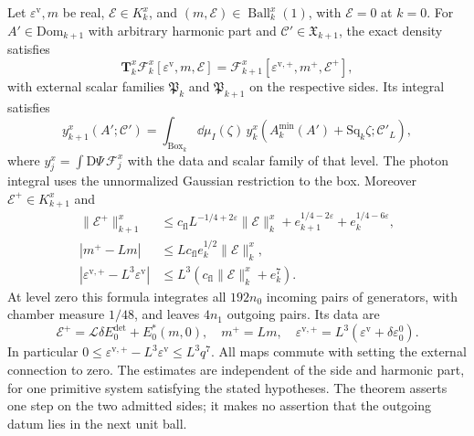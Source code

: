 \begin{theorem}
Let $\varepsilon^{\mathrm v},m$ be real,
$\mathscr E\in K_k^x$, and
$(m,\mathscr E)\in\operatorname{Ball}_k^x(1)$, with
$\mathscr E=0$ at $k=0$. For $A'\in\mathrm{Dom}_{k+1}$
with arbitrary harmonic part and
$\mathscr C'\in\mathfrak X_{k+1}$, the exact density satisfies
\begin{equation}\label{eq:rgnl-exact-step}
 \mathbf T_k^x\mathscr F_k^x[\varepsilon^{\mathrm v},m,\mathscr E]
   =\mathscr F_{k+1}^x
            [\varepsilon^{\mathrm v,+},m^+,\mathscr E^+],
\end{equation}
with external scalar families $\mathfrak P_k$ and
$\mathfrak P_{k+1}$ on the respective sides.
Its integral satisfies
\begin{equation}\label{eq:rgnl-integrated-step}
 y_{k+1}^x(A';\mathscr C')
  =\int_{\mathrm{Box}_k}\dd\mu_I(\zeta)\,
        y_k^x(A_k^{\min}(A')+\mathrm{Sq}_k\zeta;\mathscr C'_L),
\end{equation}
where $y_j^x=\int\mathrm D\Psi\,\mathscr F_j^x$ with the
data and scalar family of that level. The photon integral uses the
unnormalized Gaussian restriction to the box.
Moreover $\mathscr E^+\in K_{k+1}^x$ and
\begin{align}
 \|\mathscr E^+\|_{k+1}^x
 &\le c_{\mathrm{fl}}L^{-1/4+2\varepsilon}\|\mathscr E\|_k^x
           +e_{k+1}^{1/4-2\varepsilon}+e_k^{1/4-6\varepsilon},
                                      \label{eq:rgnl-activity-step-bound}\\
 |m^+-Lm|
 &\le Lc_{\mathrm{fl}}e_k^{1/2}\|\mathscr E\|_k^x,
                                      \label{eq:rgnl-mass-step-bound}\\
 |\varepsilon^{\mathrm v,+}-L^3\varepsilon^{\mathrm v}|
 &\le L^3(c_{\mathrm{fl}}\|\mathscr E\|_k^x+e_k^7).
                                      \label{eq:rgnl-vacuum-step-bound}
\end{align}
At level zero this formula integrates all $192n_0$
incoming pairs of generators, with chamber measure $1/48$,
and leaves $4n_1$ outgoing pairs. Its data are
\[
 \mathscr E^+=\mathcal L\delta E_0^{\mathrm{det}}+E_0^*(m,0),
 \quad m^+=Lm,\quad
 \varepsilon^{\mathrm v,+}
                         =L^3(\varepsilon^{\mathrm v}+\delta\varepsilon_0^0).
\]
In particular
$0\le\varepsilon^{\mathrm v,+}-L^3\varepsilon^{\mathrm v}
\le L^3q^7$.
All maps commute with setting the external connection to zero.
The estimates are independent of the side and harmonic part, for
one primitive system satisfying the stated hypotheses. The theorem
asserts one step on the two admitted sides; it makes no assertion
that the outgoing datum lies in the next unit ball.
\end{theorem}



